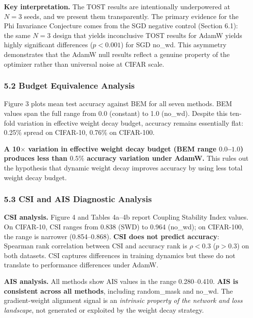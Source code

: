 \documentclass[
]{article}
\begin{document}
\textbf{Key interpretation.} The TOST results are intentionally
underpowered at \(N = 3\) seeds, and we present them transparently. The
primary evidence for the Phi Invariance Conjecture comes from the SGD
negative control (Section 6.1): the same \(N = 3\) design that yields
inconclusive TOST results for AdamW yields highly significant
differences (\(p < 0.001\)) for SGD no\_wd. This asymmetry demonstrates
that the AdamW null results reflect a genuine property of the optimizer
rather than universal noise at CIFAR scale.

\hypertarget{budget-equivalence-analysis}{%
\subsubsection{5.2 Budget Equivalence
Analysis}\label{budget-equivalence-analysis}}

Figure 3 plots mean test accuracy against BEM for all seven methods. BEM
values span the full range from 0.0 (constant) to 1.0 (no\_wd). Despite
this ten-fold variation in effective weight decay budget, accuracy
remains essentially flat: 0.25\% spread on CIFAR-10, 0.76\% on
CIFAR-100.

\textbf{A 10\(\times\) variation in effective weight decay budget (BEM
range \(0.0\)--\(1.0\)) produces less than \(0.5\%\) accuracy variation
under AdamW.} This rules out the hypothesis that dynamic weight decay
improves accuracy by using less total weight decay budget.

\hypertarget{csi-and-ais-diagnostic-analysis}{%
\subsubsection{5.3 CSI and AIS Diagnostic
Analysis}\label{csi-and-ais-diagnostic-analysis}}

\textbf{CSI analysis.} Figure 4 and Tables 4a--4b report Coupling
Stability Index values. On CIFAR-10, CSI ranges from 0.838 (SWD) to
0.964 (no\_wd); on CIFAR-100, the range is narrower (0.854--0.868).
\textbf{CSI does not predict accuracy}: Spearman rank correlation
between CSI and accuracy rank is \(\rho < 0.3\) (\(p > 0.3\)) on both
datasets. CSI captures differences in training dynamics but these do not
translate to performance differences under AdamW.

\textbf{AIS analysis.} All methods show AIS values in the range
0.280--0.410. \textbf{AIS is consistent across all methods}, including
random\_mask and no\_wd. The gradient-weight alignment signal is an
\emph{intrinsic property of the network and loss landscape}, not
generated or exploited by the weight decay strategy.
\end{document}
